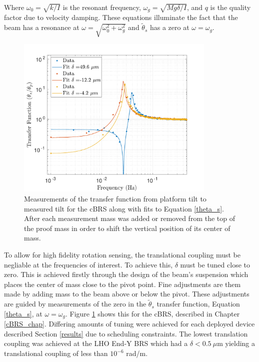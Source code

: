 \documentclass [12pt, proquest]{uwthesis}[2019]
\begin{document}
Where $\omega_0=\sqrt{k/I}$ is the resonant frequency, $\omega_g=\sqrt{M g \delta/I}$, and $q$ is the quality factor due to velocity damping. These equations illuminate the fact that the beam has a resonance at $\omega=\sqrt{\omega_0^2+\omega_g^2}$ and $\tilde{\theta}_s$ has a zero at $\omega=\omega_g$. 


\begin{figure}[!h]
\begin{center}
 \includegraphics[width=0.85\textwidth]{cBRS_TransferFunction.pdf}
\caption[Transfer function from platform tilt to measured tilt for the cBRS]{Measurements of the transfer function from platform tilt to measured tilt for the cBRS along with fits to Equation \ref{theta_s}. After each measurement mass was added or removed from the top of the proof mass in order to shift the vertical position of its center of mass.}
\label{TransferFunction}
\end{center}
\end{figure}

To allow for high fidelity rotation sensing, the translational coupling must be negliable at the frequencies of interest. To achieve this, $\delta$ must be tuned close to zero. This is achieved firstly through the design of the beam's suspension which places the center of mass close to the pivot point. Fine adjustments are them made by adding mass to the beam above or below the pivot. These adjustments are guided by measurements of the zero in the $\tilde{\theta}_s$ transfer function, Equation \ref{theta_s}, at $\omega=\omega_g$. Figure \ref{TransferFunction} shows this for the cBRS, described in Chapter \ref{cBRS_chap}. Differing amounts of tuning were achieved for each deployed device described Section \ref{results} due to scheduling constraints. The lowest translation coupling was achieved at the LHO End-Y BRS which had a $\delta<0.5\ \mu$m yielding a translational coupling of less than $10^{-6}$ rad/m.
\end{document}
